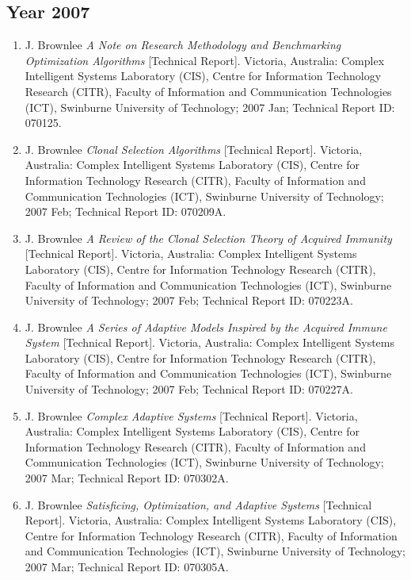 %
%
\subsection{Year 2007}

\begin{enumerate}
	\small
	\item J. Brownlee \emph{A Note on Research Methodology and Benchmarking Optimization Algorithms} [Technical Report]. Victoria, Australia: Complex Intelligent Systems Laboratory (CIS), Centre for Information Technology Research (CITR), Faculty of Information and Communication Technologies (ICT), Swinburne University of Technology; 2007 Jan; Technical Report ID: 070125.
	\item J. Brownlee \emph{Clonal Selection Algorithms} [Technical Report]. Victoria, Australia: Complex Intelligent Systems Laboratory (CIS), Centre for Information Technology Research (CITR), Faculty of Information and Communication Technologies (ICT), Swinburne University of Technology; 2007 Feb; Technical Report ID: 070209A.
	\item J. Brownlee \emph{A Review of the Clonal Selection Theory of Acquired Immunity} [Technical Report]. Victoria, Australia: Complex Intelligent Systems Laboratory (CIS), Centre for Information Technology Research (CITR), Faculty of Information and Communication Technologies (ICT), Swinburne University of Technology; 2007 Feb; Technical Report ID: 070223A.
	\item J. Brownlee \emph{A Series of Adaptive Models Inspired by the Acquired Immune System} [Technical Report]. Victoria, Australia: Complex Intelligent Systems Laboratory (CIS), Centre for Information Technology Research (CITR), Faculty of Information and Communication Technologies (ICT), Swinburne University of Technology; 2007 Feb; Technical Report ID: 070227A.
	\item J. Brownlee \emph{Complex Adaptive Systems} [Technical Report]. Victoria, Australia: Complex Intelligent Systems Laboratory (CIS), Centre for Information Technology Research (CITR), Faculty of Information and Communication Technologies (ICT), Swinburne University of Technology; 2007 Mar; Technical Report ID: 070302A.
	\item J. Brownlee \emph{Satisficing, Optimization, and Adaptive Systems} [Technical Report]. Victoria, Australia: Complex Intelligent Systems Laboratory (CIS), Centre for Information Technology Research (CITR), Faculty of Information and Communication Technologies (ICT), Swinburne University of Technology; 2007 Mar; Technical Report ID: 070305A.

\end{enumerate}
